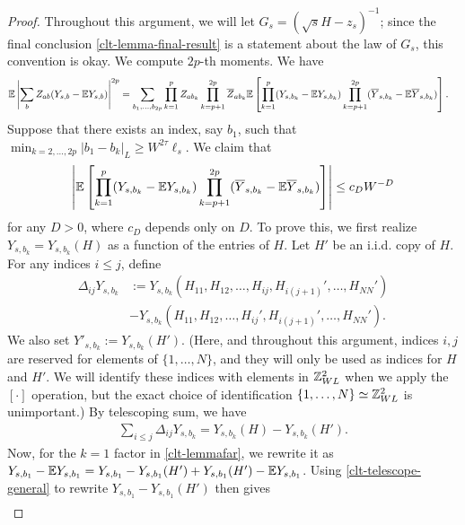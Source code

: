 \begin{proof}
Throughout this argument, we will let $G_{s}=(\sqrt{s}H-z_{s})^{-1}$; since the final conclusion \eqref{clt-lemma-final-result} is a statement about the law of $G_{s}$, this convention is okay. We compute $2p$-th moments. We have 
%
\begin{align}
\mathbb{E}\left|\sum_{b}Z_{ab}(Y_{s,b}-\mathbb{E} Y_{s,b})\right|^{2p}&=\sum_{b_{1},\ldots,b_{2p}}\prod_{k=1}^{p}Z_{ab_{k}}\prod_{k=p+1}^{2p}\overline{Z}_{ab_{k}}\mathbb{E}\left[\prod_{k=1}^{p}(Y_{s,b_{k}}-\mathbb{E} Y_{s,b_{k}})\prod_{k=p+1}^{2p}(\overline{Y}_{s,b_{k}}-\mathbb{E} \overline{Y}_{s,b_{k}})\right].\label{clt-lemmamoment}
\end{align}
%
Suppose that there exists an index, say $b_{1}$, such that $\min_{k=2,\ldots,2p}|b_{1}-b_{k}|_{L}\geq W^{2\tau}\ell_{s}$. We claim that
%
\begin{align}
\left|\mathbb{E}\left[\prod_{k=1}^{p}(Y_{s,b_{k}}-\mathbb{E} Y_{s,b_{k}})\prod_{k=p+1}^{2p}(\overline{Y}_{s,b_{k}}-\mathbb{E} \overline{Y}_{s,b_{k}})\right]\right|\leq c_{D} W^{-D}\label{clt-lemmafar}
\end{align}
%
for any $D>0$, where $c_{D}$ depends only on $D$. To prove this, we first realize $Y_{s,b_{k}}=Y_{s,b_{k}}(H)$ as a function of the entries of $H$. Let $H'$ be an i.i.d. copy of $H$. For any indices $i\leq j$, define
%
\begin{align}
\Delta_{ij}Y_{s,b_{k}}&:=Y_{s,b_{k}}(H_{11},H_{12},\ldots,H_{ij},H_{i(j+1)}',\ldots,H_{NN}')\label{clt-delta}\\
&-Y_{s,b_{k}}(H_{11},H_{12},\ldots,H_{ij}',H_{i(j+1)}',\ldots,H_{NN}').\nonumber
\end{align}
%
We also set $Y'_{s,b_{k}}:=Y_{s,b_{k}}(H')$. (Here, and throughout this argument, indices $i,j$ are reserved for elements of $\{1,\ldots,N\}$, and they will only be used as indices for $H$ and $H'$. We will identify these indices with elements in $\mathbb{Z}_{WL}^{2}$ when we apply the $[\cdot]$ operation, but the exact choice of identification $\{1,\ldots,N\}\simeq \mathbb{Z}_{WL}^{2}$ is unimportant.) By telescoping sum, we have 
%
\begin{align}
\sum_{i\leq j}\Delta_{ij}Y_{s,b_{k}}=Y_{s,b_{k}}(H)-Y_{s,b_{k}}(H').\label{clt-telescope-general}
\end{align}
%
Now, for the $k=1$ factor in \eqref{clt-lemmafar}, we rewrite it as $Y_{s,b_{1}}-\mathbb{E} Y_{s,b_{1}}=Y_{s,b_{1}}-Y_{s,b_{1}}(H')+Y_{s,b_{1}}(H')-\mathbb{E} Y_{s,b_{1}}$. Using \eqref{clt-telescope-general} to rewrite $Y_{s,b_{1}}-Y_{s,b_{1}}(H')$ then gives
%
\begin{align}

\end{align}
\end{proof}
